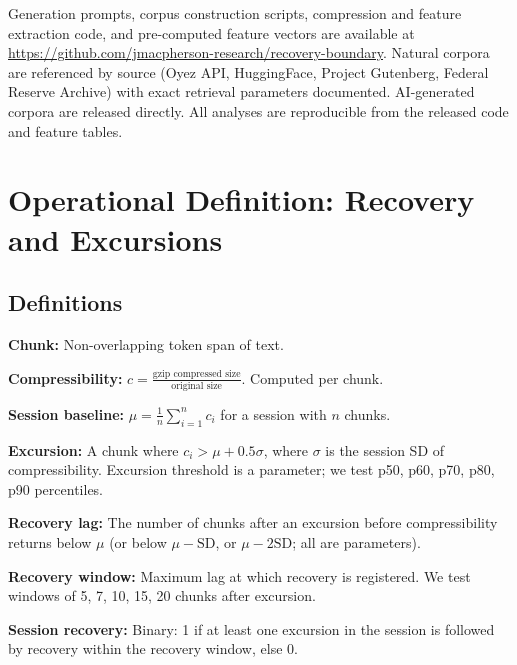 \documentclass[11pt]{article}
\begin{document}
Generation prompts, corpus construction scripts, compression and feature extraction code, and pre-computed feature vectors are available at \url{https://github.com/jmacpherson-research/recovery-boundary}. Natural corpora are referenced by source (Oyez API, HuggingFace, Project Gutenberg, Federal Reserve Archive) with exact retrieval parameters documented. AI-generated corpora are released directly. All analyses are reproducible from the released code and feature tables.




\FloatBarrier


\appendix

\section{Operational Definition: Recovery and Excursions}

\subsection{Definitions}

\textbf{Chunk:} Non-overlapping \chunkTokens\-token span of text.

\textbf{Compressibility:} $c = \frac{\text{gzip compressed size}}{\text{original size}}$. Computed per chunk.

\textbf{Session baseline:} $\mu = \frac{1}{n} \sum_{i=1}^{n} c_i$ for a session with $n$ chunks.

\textbf{Excursion:} A chunk where $c_i > \mu + 0.5 \sigma$, where $\sigma$ is the session SD of compressibility. Excursion threshold is a parameter; we test p50, p60, p70, p80, p90 percentiles.

\textbf{Recovery lag:} The number of chunks after an excursion before compressibility returns below $\mu$ (or below $\mu - \text{SD}$, or $\mu - 2\text{SD}$; all are parameters).

\textbf{Recovery window:} Maximum lag at which recovery is registered. We test windows of 5, 7, 10, 15, 20 chunks after excursion.

\textbf{Session recovery:} Binary: 1 if at least one excursion in the session is followed by recovery within the recovery window, else 0.
\end{document}
